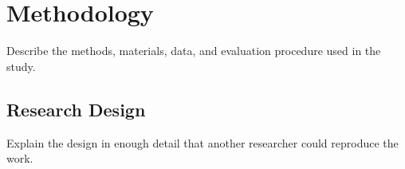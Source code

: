 \section{Methodology}
Describe the methods, materials, data, and evaluation procedure used in the study.

\subsection{Research Design}
Explain the design in enough detail that another researcher could reproduce the work.